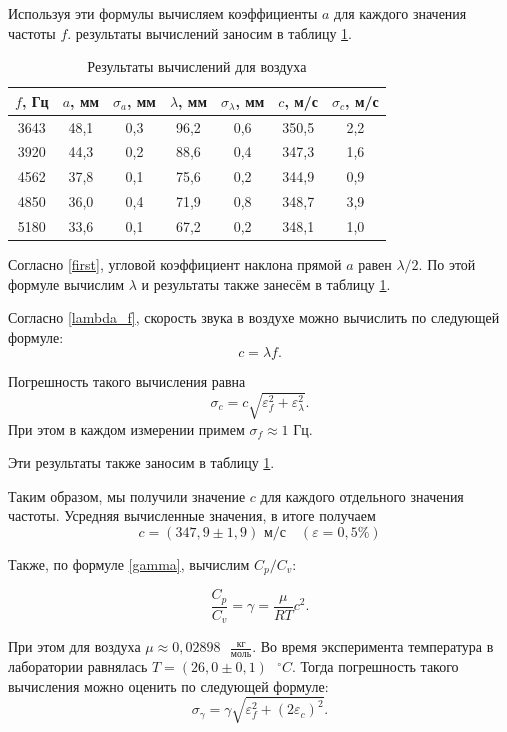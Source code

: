 \documentclass[a4paper,12pt]{article}
\theoremstyle{definition}
\begin{document}
	Используя эти формулы вычисляем коэффициенты $ a $ для каждого значения частоты $ f $. результаты вычислений заносим в таблицу \ref{tab:resO2}.
	
	\begin{table}[H]
		\centering
		\begin{tabular}{|c|c|c|c|c|c|c|}
			\hline
			$ f $, Гц & $ a $, мм & $ \sigma_a $, мм & $ \lambda $, мм & $ \sigma_\lambda $, мм & $ c $, м/с & $ \sigma_c $, м/с \\ \hline
			3643 & 48,1 & 0,3 & 96,2 & 0,6 & 350,5 & 2,2 \\ \hline
			3920 & 44,3 & 0,2 & 88,6 & 0,4 & 347,3 & 1,6 \\ \hline
			4562 & 37,8 & 0,1 & 75,6 & 0,2 & 344,9 & 0,9 \\ \hline
			4850 & 36,0 & 0,4 & 71,9 & 0,8 & 348,7 & 3,9 \\ \hline
			5180 & 33,6 & 0,1 & 67,2 & 0,2 & 348,1 & 1,0 \\ \hline
		\end{tabular}
		\caption{Результаты вычислений для воздуха}
		\label{tab:resO2}
	\end{table}
	
	Согласно \eqref{first}, угловой коэффициент наклона прямой $ a $ равен $ \lambda/2 $. По этой формуле вычислим $ \lambda $ и результаты также занесём в таблицу \ref{tab:resO2}.
	
	Согласно \eqref{lambda_f}, скорость звука в воздухе можно вычислить по следующей формуле: 
	\[ c = \lambda f. \]
	
	Погрешность такого вычисления равна \[ \sigma_c=c\sqrt{\varepsilon_f^2+\varepsilon_\lambda^2}. \] При этом в каждом измерении примем $ \sigma_f \approx 1 $ Гц.
	
	Эти результаты также заносим в таблицу \ref{tab:resO2}.
	
	Таким образом, мы получили значение $ c $ для каждого отдельного значения частоты. Усредняя вычисленные значения, в итоге получаем \[\boxed{ c = (347,9 \pm 1,9) \text{ м/с}}\quad (\varepsilon=0,5\%) \]
	
	Также, по формуле \eqref{gamma}, вычислим $ C_p/C_v $:
	
	\[ \frac{C_p}{C_v} = \gamma = \frac{\mu}{RT}c^2. \]
	
	При этом для воздуха $ \displaystyle \mu \approx 0,02898 \text{ } \frac{\text{кг}}{\text{моль}} $. Во время эксперимента температура в лаборатории равнялась $ T = (26,0 \pm 0,1) \text{ } ^\circ C $. Тогда погрешность такого вычисления можно оценить по следующей формуле:
	\[ \sigma_\gamma = \gamma\sqrt{\varepsilon_f^2+\left(2\varepsilon_c\right)^2}.\]
	
\end{document}
